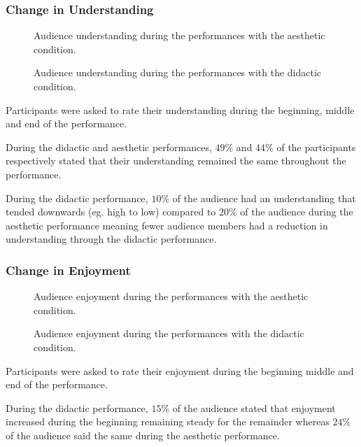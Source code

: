 \documentclass{sig-alternate}
\begin{document}
\subsubsection{Change in Understanding}

\begin{figure}
\centering
{}
\caption{Audience understanding during the performances with the aesthetic condition.}
\end{figure}

\begin{figure}
\centering
{}
\caption{Audience understanding during the performances with the didactic condition.}
\end{figure}

Participants were asked to rate their understanding during the beginning, middle and end of the performance.

During the didactic and aesthetic performances, $49\%$ and $44\%$ of the participants respectively stated that their understanding remained the same throughout the performance.

During the didactic performance, $10\%$ of the audience had an understanding that tended downwards (eg. high to low) compared to $20\%$ of the audience during the aesthetic performance meaning fewer audience members had a reduction in understanding through the didactic performance.

\subsubsection{Change in Enjoyment}

\begin{figure}
\centering
{}
\caption{Audience enjoyment during the performances with the aesthetic condition.}
\end{figure}

\begin{figure}
\centering
{}
\caption{Audience enjoyment during the performances with the didactic condition.}
\end{figure}

Participants were asked to rate their enjoyment during the beginning middle and end of the performance.

During the didactic performance, $15\%$ of the audience stated that enjoyment increased during the beginning remaining steady for the remainder whereas $24\%$ of the audience said the same during the aesthetic performance.
\end{document}
